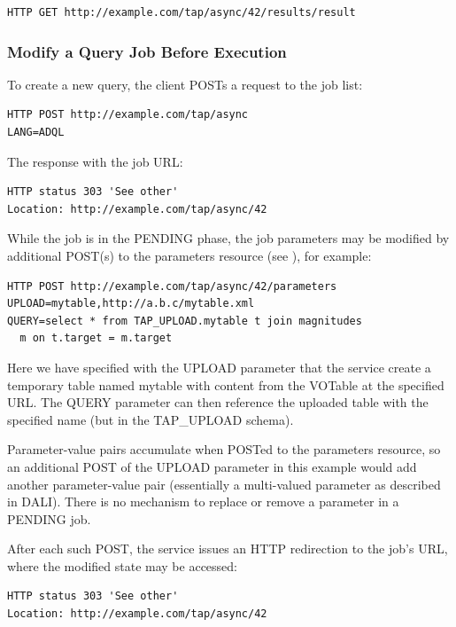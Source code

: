 \documentclass[11pt,letter]{ivoa}
\newcommand{\tapupload}{TAP\_UPLOAD}
\newcommand{\tapupload}{%
  {\relsize{-0.5}TAP\discretionary{-}{}{\kern-2pt\_}UPLOAD}}
\begin{document}
\begin{verbatim}
HTTP GET http://example.com/tap/async/42/results/result
\end{verbatim}

\subsubsection{Modify a Query Job Before Execution}
To create a new query, the client POSTs a request to the job list:

\begin{verbatim}
HTTP POST http://example.com/tap/async
LANG=ADQL
\end{verbatim}

The response with the job URL:

\begin{verbatim}
HTTP status 303 'See other'
Location: http://example.com/tap/async/42
\end{verbatim}

While the job is in the PENDING phase, the job parameters may be modified 
by additional POST(s) to the parameters resource (see 
\citet{2017ivoa.spec.0517D}), for example:

\begin{verbatim}
HTTP POST http://example.com/tap/async/42/parameters
UPLOAD=mytable,http://a.b.c/mytable.xml
QUERY=select * from TAP_UPLOAD.mytable t join magnitudes 
  m on t.target = m.target
\end{verbatim}

Here we have specified with the UPLOAD parameter that the service create a 
temporary table named mytable with content from the VOTable at the specified 
URL. The QUERY parameter can then reference the uploaded table with the 
specified name (but in the \tapupload{} schema).

Parameter-value pairs accumulate when POSTed to the parameters resource, so an 
additional POST of the UPLOAD parameter in this example would add another 
parameter-value pair (essentially a multi-valued parameter as described in 
DALI). There is no mechanism to replace or remove a parameter in a 
PENDING job.

After each such POST, the service issues an HTTP redirection to the job's URL, 
where the modified state may be accessed:

\begin{verbatim}
HTTP status 303 'See other'
Location: http://example.com/tap/async/42
\end{verbatim}
\end{document}

